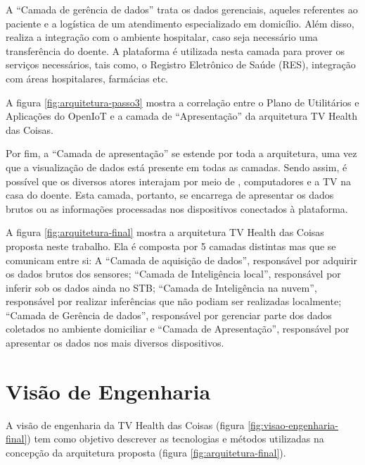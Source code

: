 A ``Camada de gerência de dados'' trata os dados gerenciais, aqueles
referentes ao paciente e a logística de um atendimento especializado em
domicílio. Além disso, realiza a integração com o ambiente hospitalar, caso
seja necessário uma transferência do doente. A plataforma \nextsaude[]
é utilizada nesta camada para prover os serviços necessários, tais como, o 
Registro Eletrônico de Saúde (RES), integração com áreas hospitalares, farmácias etc.

A figura \ref{fig:arquitetura-passo3} mostra a correlação entre o Plano
de Utilitários e Aplicações do OpenIoT e a camada de ``Apresentação'' da arquitetura 
TV Health das Coisas.


Por fim, a ``Camada de apresentação'' se estende por toda a arquitetura, uma
vez que a visualização de dados está presente em todas as camadas. Sendo assim,
é possível que os diversos atores interajam por meio de \smartphones,
computadores e a TV na casa do doente.  Esta camada, portanto, se encarrega de
apresentar os dados brutos ou as informações processadas nos dispositivos
conectados à plataforma. 

A figura \ref{fig:arquitetura-final} mostra a arquitetura TV Health das Coisas 
proposta neste trabalho. Ela é composta por 5 camadas distintas mas que se comunicam
entre si: A ``Camada de aquisição de
dados'', responsável por adquirir os dados brutos dos sensores; ``Camada de
Inteligência local'', responsável por inferir sob os dados ainda no
STB; ``Camada de Inteligência na nuvem'', responsável por realizar
inferências que não podiam ser realizadas localmente; ``Camada de Gerência
de dados'', responsável por gerenciar parte dos dados coletados no ambiente
domiciliar e ``Camada de Apresentação'', responsável por
apresentar os dados nos mais diversos dispositivos.


\section{Visão de Engenharia} \label{sec:visao-engenharia}

A visão de engenharia da TV Health das Coisas (figura
\ref{fig:visao-engenharia-final}) tem como objetivo descrever as tecnologias e
métodos utilizadas na concepção da arquitetura proposta (figura
\ref{fig:arquitetura-final}).

